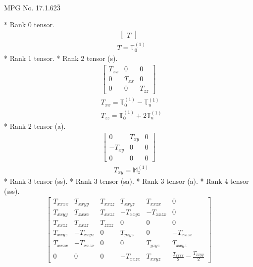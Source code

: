 \documentclass[fleqn,8pt,landscape]{jsarticle}
\begin{document}
\setcounter{MaxMatrixCols}{32}

\renewcommand{\tablename}{Table~}
\renewcommand{\figurename}{Figure~}
\begin{center}
\LARGE
MPG No. 17.1.62\quad$\bar{3}$
\end{center}
* Rank 0 tensor.
\begin{align*}
\begin{bmatrix} T \end{bmatrix}
\end{align*}
\begin{align*}
& T = \mathbb{T}_{0}^{(1)}
\end{align*}
* Rank 1 tensor.
* Rank 2 tensor (s).
\begin{align*}
\begin{bmatrix} T_{xx} & 0 & 0 \\ 0 & T_{xx} & 0 \\ 0 & 0 & T_{zz} \end{bmatrix}
\end{align*}
\begin{align*}
& T_{xx} = \mathbb{T}_{0}^{(1)} - \mathbb{T}_{u}^{(1)} \\
& T_{zz} = \mathbb{T}_{0}^{(1)} + 2 \mathbb{T}_{u}^{(1)}
\end{align*}
* Rank 2 tensor (a).
\begin{align*}
\begin{bmatrix} 0 & T_{xy} & 0 \\ - T_{xy} & 0 & 0 \\ 0 & 0 & 0 \end{bmatrix}
\end{align*}
\begin{align*}
& T_{xy} = \mathbb{M}_{z}^{(1)}
\end{align*}
* Rank 3 tensor (ss).
* Rank 3 tensor (sa).
* Rank 3 tensor (a).
* Rank 4 tensor (sss).
\begin{align*}
\begin{bmatrix} T_{xxxx} & T_{xxyy} & T_{xxzz} & T_{xxyz} & T_{xxzx} & 0 \\ T_{xxyy} & T_{xxxx} & T_{xxzz} & - T_{xxyz} & - T_{xxzx} & 0 \\ T_{xxzz} & T_{xxzz} & T_{zzzz} & 0 & 0 & 0 \\ T_{xxyz} & - T_{xxyz} & 0 & T_{yzyz} & 0 & - T_{xxzx} \\ T_{xxzx} & - T_{xxzx} & 0 & 0 & T_{yzyz} & T_{xxyz} \\ 0 & 0 & 0 & - T_{xxzx} & T_{xxyz} & \frac{T_{xxxx}}{2} - \frac{T_{xxyy}}{2} \end{bmatrix}
\end{align*}
\end{document}
